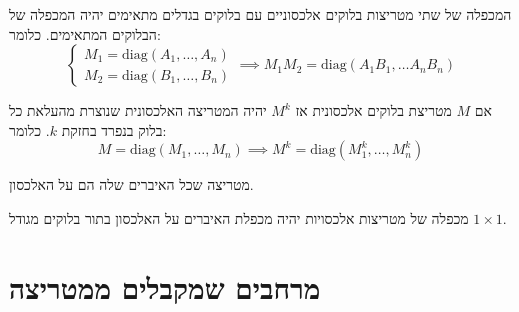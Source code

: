 \documentclass{tstextbook}
\begin{document}
\begin{proposition}
המכפלה של שתי מטריצות בלוקים אלכסוניים עם בלוקים בגדלים מתאימים יהיה המכפלה של הבלוקים המתאימים. כלומר:
$$\begin{cases}M_{1}=\mathrm{diag}\left( A_{1},\dots,A_{n} \right) \\M_{2} =\mathrm{diag}\left( B_{1},\dots, B_{n}\right)
\end{cases}\implies M_{1}M_{2}=\mathrm{diag}\left( A_{1}B_{1},\dots A_{n}B_{n} \right)$$

\end{proposition}
\begin{corollary}
אם \(M\) מטריצת בלוקים אלכסונית אז \(M^{k}\) יהיה המטריצה האלכסונית שנוצרת מהעלאת כל בלוק בנפרד בחזקת \(k\). כלומר:
$$M=\mathrm{diag}\left( M_{1},\dots ,M_{n} \right)\implies M^{k}=\mathrm{diag}\left( M_{1}^{k},\dots, M_{n}^{k} \right)$$

\end{corollary}
\begin{definition}
מטריצה שכל האיברים שלה הם על האלכסון.

\end{definition}
\begin{corollary}
מכפלה של מטריצות אלכסויות יהיה מכפלת האיברים על האלכסון בתור בלוקים מגודל \(1\times 1\).

\end{corollary}
\section{מרחבים שמקבלים ממטריצה}
\end{document}
